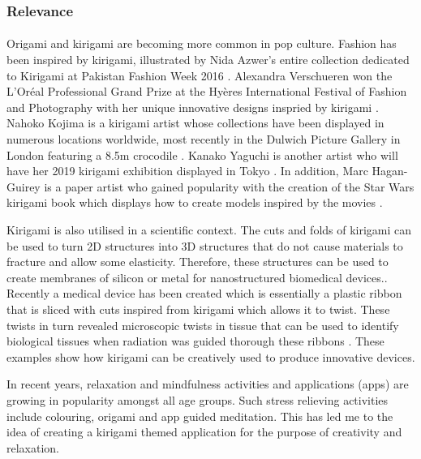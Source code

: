 \documentclass[11pt]{article}
\begin{document}
            \subsubsection{Relevance}
                \paragraph{}
                Origami and kirigami are becoming more common in pop culture. Fashion has been inspired by kirigami, illustrated by Nida Azwer's entire collection dedicated to Kirigami at Pakistan Fashion Week 2016 \cite{NidaAzwer}.
                Alexandra Verschueren won the L'Oréal Professional Grand Prize at the Hyères International Festival of Fashion and Photography with her unique innovative designs inspried by kirigami \cite{AlexandraVerschueren}. Nahoko Kojima is a kirigami artist whose collections have been displayed in numerous locations worldwide, most recently in the Dulwich Picture Gallery in London featuring a 8.5m crocodile \cite{NahokoKojima}.
                Kanako Yaguchi is another artist who will have her 2019 kirigami exhibition displayed in Tokyo \cite{KanakoYaguchi}. In addition, Marc Hagan-Guirey is a paper artist who gained popularity with the creation of the Star Wars kirigami book which displays how to create models inspired by the movies \cite{StarWars}.
            
                Kirigami is also utilised in a scientific context. The cuts and folds of kirigami can be used to turn 2D structures into 3D structures that do not cause materials to fracture and allow some elasticity. Therefore, these structures can be used to create membranes of silicon or metal for nanostructured biomedical devices.\cite{MedicalTextures}.%
                Recently a medical device has been created which is essentially a  plastic ribbon that is sliced with cuts inspired from kirigami which allows it to twist. These twists in turn revealed microscopic twists in tissue that can be used to identify biological tissues when radiation was guided thorough these ribbons \cite{MedicalDevice}.
               These examples show how kirigami can be creatively used to produce innovative devices.
               
               In recent years, relaxation and mindfulness activities and applications (apps) are growing in popularity amongst all age groups. Such stress relieving activities include colouring, origami and app guided meditation. This has led me to the idea of creating a kirigami themed application for the purpose of creativity and relaxation.
    
\end{document}

